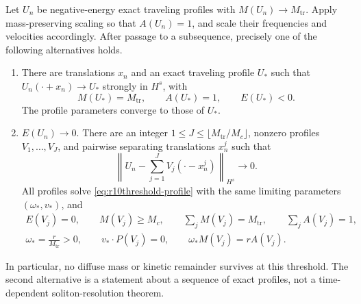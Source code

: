 \begin{theorem}
\label{thm:r10threshold-compact}
Let $U_n$ be negative-energy exact traveling profiles with
$M(U_n)\to M_{\mathrm{tr}}$. Apply mass-preserving scaling so that
$A(U_n)=1$, and scale their frequencies and velocities accordingly.
After passage to a subsequence, precisely one of the following
alternatives holds.
\begin{enumerate}
\item There are translations $x_n$ and an exact traveling profile
$U_*$ such that $U_n(\cdot+x_n)\to U_*$ strongly in $H^s$, with
\[
 M(U_*)=M_{\mathrm{tr}},\qquad A(U_*)=1,\qquad E(U_*)<0.
\]
The profile parameters converge to those of $U_*$.
\item $E(U_n)\to0$. There are an integer
$1\le J\le\lfloor M_{\mathrm{tr}}/M_c\rfloor$, nonzero profiles
$V_1,\ldots,V_J$, and pairwise separating translations $x_n^j$ such that
\begin{equation}\label{eq:r10threshold-decomp}
 \left\|U_n-\sum_{j=1}^J V_j(\cdot-x_n^j)\right\|_{H^s}\longrightarrow0.
\end{equation}
All profiles solve \eqref{eq:r10threshold-profile} with the same
limiting parameters $(\omega_*,v_*)$, and
\begin{gather}
 E(V_j)=0,\qquad M(V_j)\ge M_c,\qquad
 \sum_jM(V_j)=M_{\mathrm{tr}},\qquad \sum_jA(V_j)=1,
 \label{eq:r10threshold-sums}\\
 \omega_*=\frac{r}{M_{\mathrm{tr}}}>0,\qquad
 v_*\cdot P(V_j)=0,\qquad \omega_*M(V_j)=rA(V_j).
 \label{eq:r10threshold-endpointparameters}
\end{gather}
\end{enumerate}
In particular, no diffuse mass or kinetic remainder survives at this
threshold. The second alternative is a statement about a sequence of
exact profiles, not a time-dependent soliton-resolution theorem.
\end{theorem}
